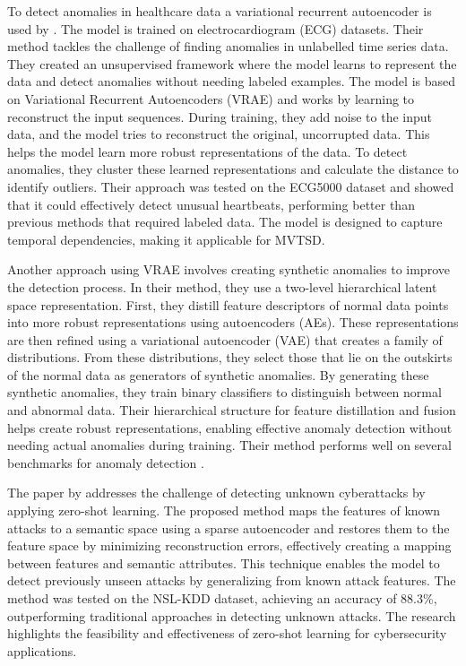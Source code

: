 To detect anomalies in healthcare data a variational recurrent autoencoder is used by \cite{pereira_learning_2019}.
The model is trained on electrocardiogram (ECG) datasets. Their method tackles the challenge of finding anomalies in unlabelled time series data. They created an unsupervised framework where the model learns to represent the data and detect anomalies without needing labeled examples.
The model is based on Variational Recurrent Autoencoders (VRAE) and works by learning to reconstruct the input sequences. During training, they add noise to the input data, and the model tries to reconstruct the original, uncorrupted data. This helps the model learn more robust representations of the data. To detect anomalies, they cluster these learned representations and calculate the distance to identify outliers. Their approach was tested on the ECG5000 dataset and showed that it could effectively detect unusual heartbeats, performing better than previous methods that required labeled data. The model is designed to capture temporal dependencies, making it applicable for MVTSD.

%
Another approach using VRAE involves creating synthetic anomalies to improve the detection process. In their method, they use a two-level hierarchical latent space representation. First, they distill feature descriptors of normal data points into more robust representations using autoencoders (AEs). These representations are then refined using a variational autoencoder (VAE) that creates a family of distributions. From these distributions, they select those that lie on the outskirts of the normal data as generators of synthetic anomalies.
By generating these synthetic anomalies, they train binary classifiers to distinguish between normal and abnormal data. Their hierarchical structure for feature distillation and fusion helps create robust representations, enabling effective anomaly detection without needing actual anomalies during training. Their method performs well on several benchmarks for anomaly detection  \cite{ramirez_rivera_anomaly_2022}.

The paper by \cite{zhang_unknown_2020} addresses the challenge of detecting unknown cyberattacks by applying zero-shot learning. The proposed method maps the features of known attacks to a semantic space using a sparse autoencoder and restores them to the feature space by minimizing reconstruction errors, effectively creating a mapping between features and semantic attributes. This technique enables the model to detect previously unseen attacks by generalizing from known attack features. The method was tested on the NSL-KDD dataset, achieving an accuracy of 88.3\%, outperforming traditional approaches in detecting unknown attacks. The research highlights the feasibility and effectiveness of zero-shot learning for cybersecurity applications.

